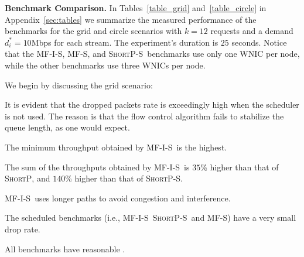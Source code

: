 \documentclass[11pt]{article}
\newenvironment{proof sketch}[1]{\noindent {\emph{Proof sketch of #1:}}}{\hfill \qed}
\newcommand{\PER}{\text{\sc{per}}}
\newcommand{\algA}{\textsc{MF-I-S}}
\newcommand{\algB}{\textsc{ShortP}}
\newcommand{\algBS}{\textsc{ShortP-S}}
\newcommand{\algE}{\textsc{MF-S}}
\newcommand{\algS}{\algB}
\begin{document}

\medskip
\noindent
\textbf{Benchmark Comparison.}  In Tables~\ref{table_grid}
and~\ref{table_circle} in Appendix~\ref{sec:tables} we summarize the
measured performance of the benchmarks for the grid and circle
scenarios with $k=12$ requests and a demand $d^*_i=10$Mbps for each
stream. The experiment's duration is $25$ seconds.  Notice that the
\algA , \algE , and \algBS\ benchmarks use only one WNIC per node,
while the other benchmarks use three WNICs per node.

We begin by discussing the grid scenario:
\begin{inparaenum}[(1)]%
\item It is evident that the dropped packets rate is exceedingly high
  when the scheduler is not used. The reason is that the flow control
  algorithm fails to stabilize the queue length, as one would expect.
\item The minimum throughput obtained by \algA\ is the highest.
\item The sum of the throughputs obtained by \algA\ is $35$\% higher
  than that of \algS, and $140$\% higher than that of \algBS.
\item \algA\ uses longer paths to avoid congestion and interference.
\item The scheduled benchmarks (i.e., \algA\, \algBS\ and \algE ) have
  a very small drop rate.
\item All benchmarks have reasonable \PER.
\end{inparaenum}%
\end{document}

